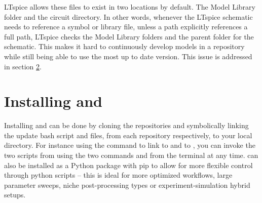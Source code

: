 LTspice allows these files to exist in two locations by default. The Model Library folder and the circuit directory. In other words, whenever the LTspice schematic needs to reference a symbol or
library file, unless a path explicitly references a full path, LTspice checks the Model Library folders 
and the parent folder for the schematic. This makes it hard to continuously develop models in a repository
while still being able to use the most up to date version. This issue is addressed in section \ref{qnn-spice}.










\section{Installing  and  }

Installing  and  can be done by cloning the repositories
and symbolically linking the update bash script and  files, from each repository
respectively, to your local 
directory. For instance using the  command to link 
to  and  to , you can invoke
the two scripts from using the two commands  and  from the terminal at
any time.
 can also be installed as a Python package with pip to allow for more
flexible control through python scripts -- this is ideal for more optimized workflows,
large parameter sweeps, niche post-processing types or experiment-simulation hybrid
setups.

\section{} \label{qnn-spice}

